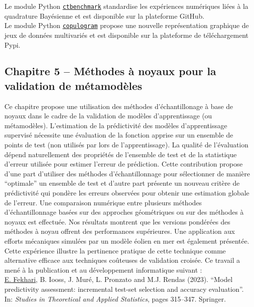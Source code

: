 \noindent
{} Le module Python \href{https://github.com/efekhari27/ctbenchmark}{\texttt{ctbenchmark}} standardise les expériences numériques liées à la quadrature Bayésienne et est disponible sur la plateforme GitHub.\\

\noindent
{} Le module Python \href{https://github.com/efekhari27/copulogram}{\texttt{copulogram}} propose une nouvelle représentation graphique de jeux de données multivariés et est disponible sur la plateforme de téléchargement Pypi.



\subsection*{Chapitre 5 -- Méthodes à noyaux pour la validation de métamodèles}

Ce chapitre propose une utilisation des méthodes d'échantillonage à base de noyaux dans le cadre de la validation de modèles d'apprentissage (ou métamodèles). 
L'estimation de la prédictivité des modèles d'apprentissage supervisé nécessite une évaluation de la fonction apprise sur un ensemble de points de test (non utilisés par lors de l'apprentissage). 
La qualité de l'évaluation dépend naturellement des propriétés de l'ensemble de test et de la statistique d'erreur utilisée pour estimer l'erreur de prédiction. 
Cette contribution propose d'une part d'utiliser des méthodes d'échantillonnage pour sélectionner de manière ``optimale'' un ensemble de test et d'autre part présente un nouveau critère de prédictivité qui pondère les erreurs observées pour obtenir une estimation globale de l'erreur. 
Une comparaison numérique entre plusieurs méthodes d'échantillonnage basées sur des approches géométriques \citep{shang_apley_2020} ou sur des méthodes à noyaux \citep{chen_welling_2010,mak_joseph_2018} est effectuée. 
Nos résultats montrent que les versions pondérées des méthodes à noyau offrent des performances supérieures. 
Une application aux efforts mécaniques simulées par un modèle éolien en mer est également présentée. 
Cette expérience illustre la pertinence pratique de cette technique comme alternative efficace aux techniques coûteuses de validation croisée. 
Ce travail a mené à la publication et au développement informatique suivant : \\

\noindent
{} \underline{E. Fekhari}, B. Iooss, J. Muré, L. Pronzato and M.J. Rendas (2023). ``Model predictivity assessment: incremental test-set selection and accuracy evaluation''. In: \textit{Studies in Theoretical and Applied Statistics}, pages 315--347. Springer.\\


